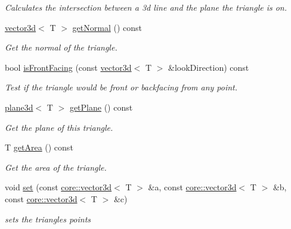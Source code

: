 \begin{DoxyCompactItemize}
\begin{DoxyCompactList}\small\item\em Calculates the intersection between a 3d line and the plane the triangle is on. \end{DoxyCompactList}\item 
\hyperlink{classirr_1_1core_1_1vector3d}{vector3d}$<$ T $>$ \hyperlink{classirr_1_1core_1_1triangle3d_af894905e54d2c29bdb23f95f892604f1}{get\+Normal} () const
\begin{DoxyCompactList}\small\item\em Get the normal of the triangle. \end{DoxyCompactList}\item 
bool \hyperlink{classirr_1_1core_1_1triangle3d_a9befd6b07fc8067d16cf313b35b835db}{is\+Front\+Facing} (const \hyperlink{classirr_1_1core_1_1vector3d}{vector3d}$<$ T $>$ \&look\+Direction) const
\begin{DoxyCompactList}\small\item\em Test if the triangle would be front or backfacing from any point. \end{DoxyCompactList}\item 
\mbox{\label{classirr_1_1core_1_1triangle3d_a7b5460728cb47e5b2abb6d0e64b74577}} 
\hyperlink{classirr_1_1core_1_1plane3d}{plane3d}$<$ T $>$ \hyperlink{classirr_1_1core_1_1triangle3d_a7b5460728cb47e5b2abb6d0e64b74577}{get\+Plane} () const
\begin{DoxyCompactList}\small\item\em Get the plane of this triangle. \end{DoxyCompactList}\item 
\mbox{\label{classirr_1_1core_1_1triangle3d_af8fd529a8e73b395c72507d76bf4f02d}} 
T \hyperlink{classirr_1_1core_1_1triangle3d_af8fd529a8e73b395c72507d76bf4f02d}{get\+Area} () const
\begin{DoxyCompactList}\small\item\em Get the area of the triangle. \end{DoxyCompactList}\item 
\mbox{\label{classirr_1_1core_1_1triangle3d_aebcd3f29fcbf9008dac95810c81f152c}} 
void \hyperlink{classirr_1_1core_1_1triangle3d_aebcd3f29fcbf9008dac95810c81f152c}{set} (const \hyperlink{classirr_1_1core_1_1vector3d}{core\+::vector3d}$<$ T $>$ \&a, const \hyperlink{classirr_1_1core_1_1vector3d}{core\+::vector3d}$<$ T $>$ \&b, const \hyperlink{classirr_1_1core_1_1vector3d}{core\+::vector3d}$<$ T $>$ \&c)
\begin{DoxyCompactList}\small\item\em sets the triangle\textquotesingle{}s points \end{DoxyCompactList}\end{DoxyCompactItemize}
